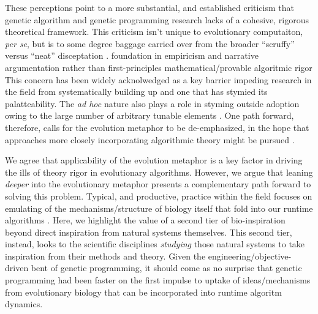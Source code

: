 These perceptions point to a more substantial, and established criticism that genetic algorithm and genetic programming research lacks of a cohesive, rigorous theoretical framework.
This criticism isn't unique to evolutionary computaiton, \textit{per se}, but is to some degree baggage carried over from the broader ``scruffy'' versus ``neat'' disceptation \citep[p. 16]{jones2008artificial} \citep{minsky1991logical}.
foundation in empiricism and narrative argumentation rather than first-principles mathematical/provable algoritmic rigor
This concern has been widely acknolwedged as a key barrier impeding research in the field from systematically building up and one that has stymied its palatteability.
The \textit{ad hoc} nature also plays a role in styming outside adoption owing to the large number of arbitrary tunable elements \citep{oneil2010open}.
One path forward, therefore, calls for the evolution metaphor to be de-emphasized, in the hope that approaches more closely incorporating algorithmic theory might be pursued \citep{moore2023evolution}.

We agree that applicability of the evolution metaphor is a key factor in driving the ills of theory rigor in evolutionary algorithms.
However, we argue that leaning \textit{deeper} into the evolutionary metaphor presents a complementary path forward to solving this problem.
Typical, and productive, practice within the field focuses on emulating of the mechanisms/structure of biology itself that fold into our runtime algorithms \citep{banzhaf2006artificial,kumar2003biologically}.
Here, we highlight the value of a second tier of bio-inspiration beyond direct inspiration from natural systems themselves.
This second tier, instead, looks to the scientific disciplines \textit{studying} those natural systems to take inspiration from their methods and theory.
Given the engineering/objective-driven bent of genetic programming, it should come as no surprise that genetic programming had been faster on the first impulse to uptake of ideas/mechanisms from evolutionary biology that can be incorporated into runtime algoritm dynamics.

